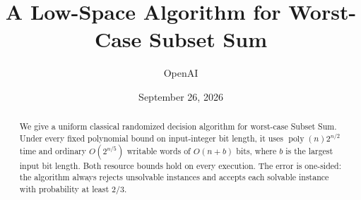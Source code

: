 \documentclass[11pt]{article}
\title{A Low-Space Algorithm for Worst-Case Subset Sum}
\author{OpenAI}
\date{September 26, 2026}
\theoremstyle{definition}
\theoremstyle{remark}
\newcommand{\poly}{\operatorname{poly}}
\newcommand{\1}{\mathbf 1}
\begin{document}
\maketitle

\begin{abstract}
We give a uniform classical randomized decision algorithm for worst-case
Subset Sum. Under every fixed polynomial bound on input-integer bit length,
it uses $\poly(n)2^{n/2}$ time and ordinary $O(2^{n/5})$ writable words
of $O(n+b)$ bits, where $b$ is the largest input bit length. Both resource
bounds hold on every execution. The error is one-sided: the algorithm always
rejects unsolvable instances and accepts each solvable instance with
probability at least $2/3$.
\end{abstract}











\end{document}
